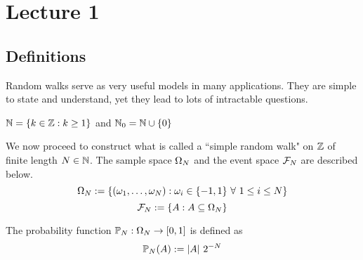 \documentclass[main]{subfiles}
\begin{document}
\chapter*{Lecture 1} %
\setcounter{chapter}{1} %
\setcounter{section}{0}


\vspace{-0.75cm}
\section{Definitions}

Random walks serve as very useful models in many applications. They are simple to state and understand, yet they lead to lots of intractable questions.\\

\begin{notation}
    $ \N=\{k\in\Z:k\ge 1\} $ and $ \N_{0}=\N \cup \{0\} $\\
\end{notation}
We now proceed to construct what is called a ``simple random walk" on $ \Z $ of finite length $ N\in\N $.
The sample space $ \O_N $ and the event space $ \F_N $ are described below.
$$ \O_N:=\{(\o_1,\ldots,\o_N):\o_i\in\{-1,1\}\ \forall\ 1\le i\le N\} $$
$$ \F_N:=\{A:A\subseteq \O_N\} $$

The probability function $ \P_N:\O_N\to [0,1] $ is defined as
$$ \P_N(A):=\lvert A\rvert\ 2^{-N} $$
\end{document}
